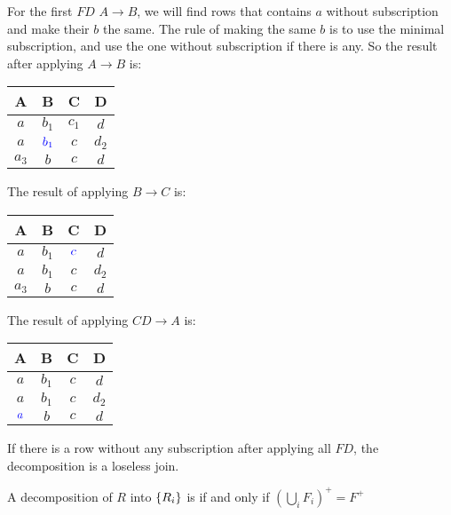 For the first $FD$ $A \rightarrow B$, we will find rows that contains $a$ without subscription and make their $b$ the same. The rule of making the same $b$ is to use the minimal subscription, and use the one without subscription if there is any. So the result after applying $A \rightarrow B$ is:

\begin{center} 
   \begin{tabular}{|c|c|c|c|}
  \hline
  A & B & C & D \\
  \hline
  $a$ & $b_1$ & $c_1$ & $d$ \\
  \hline
  $a$ & $\textcolor{blue}{b_1}$ & $c$ & $d_2$ \\
  \hline
  $a_3$ & $b$ & $c$ & $d$ \\
  \hline
\end{tabular} 
\end{center}

The result of applying $B \rightarrow C$ is:

\begin{center} 
   \begin{tabular}{|c|c|c|c|}
  \hline
  A & B & C & D \\
  \hline
  $a$ & $b_1$ & $\textcolor{blue}{c}$ & $d$ \\
  \hline
  $a$ & $b_1$ & $c$ & $d_2$ \\
  \hline
  $a_3$ & $b$ & $c$ & $d$ \\
  \hline
\end{tabular} 
\end{center}

The result of applying $CD \rightarrow A$ is:
\begin{center} 
   \begin{tabular}{|c|c|c|c|}
  \hline
  A & B & C & D \\
  \hline
  $a$ & $b_1$ & $c$ & $d$ \\
  \hline
  $a$ & $b_1$ & $c$ & $d_2$ \\
  \hline
  $\textcolor{blue}{a}$ & $b$ & $c$ & $d$ \\
  \hline
\end{tabular} 
\end{center}

If there is a row without any subscription after applying all $FD$, the decomposition is a loseless join.


\begin{theorem}
    A decomposition of $R$ into $\set{R_i}$ is  if and only if $\left (\bigcup_i F_i \right)^{+} = F^{+}$
\end{theorem}


